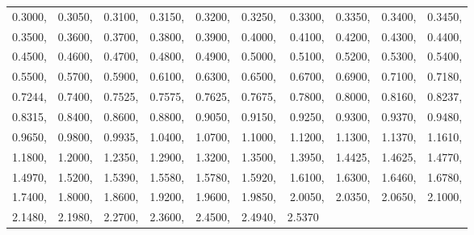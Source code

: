 \begin{table}
\begin{tabular}{|| r r r r r r r r r r ||}
\hline
0.3000, & 0.3050, & 0.3100, & 0.3150, & 0.3200, & 0.3250, & 0.3300, & 0.3350, & 0.3400, & 0.3450, \\
0.3500, & 0.3600, & 0.3700, & 0.3800, & 0.3900, & 0.4000, & 0.4100, & 0.4200, & 0.4300, & 0.4400, \\
0.4500, & 0.4600, & 0.4700, & 0.4800, & 0.4900, & 0.5000, & 0.5100, & 0.5200, & 0.5300, & 0.5400, \\
0.5500, & 0.5700, & 0.5900, & 0.6100, & 0.6300, & 0.6500, & 0.6700, & 0.6900, & 0.7100, & 0.7180, \\
0.7244, & 0.7400, & 0.7525, & 0.7575, & 0.7625, & 0.7675, & 0.7800, & 0.8000, & 0.8160, & 0.8237, \\
0.8315, & 0.8400, & 0.8600, & 0.8800, & 0.9050, & 0.9150, & 0.9250, & 0.9300, & 0.9370, & 0.9480, \\
0.9650, & 0.9800, & 0.9935, & 1.0400, & 1.0700, & 1.1000, & 1.1200, & 1.1300, & 1.1370, & 1.1610, \\
1.1800, & 1.2000, & 1.2350, & 1.2900, & 1.3200, & 1.3500, & 1.3950, & 1.4425, & 1.4625, & 1.4770, \\
1.4970, & 1.5200, & 1.5390, & 1.5580, & 1.5780, & 1.5920, & 1.6100, & 1.6300, & 1.6460, & 1.6780, \\
1.7400, & 1.8000, & 1.8600, & 1.9200, & 1.9600, & 1.9850, & 2.0050, & 2.0350, & 2.0650, & 2.1000, \\
2.1480, & 2.1980, & 2.2700, & 2.3600, & 2.4500, & 2.4940, & 2.5370~ & & & \\
\hline\hline
\end{tabular}
\label{table:solar-spectral-irradiance-function.}
\end{table}

